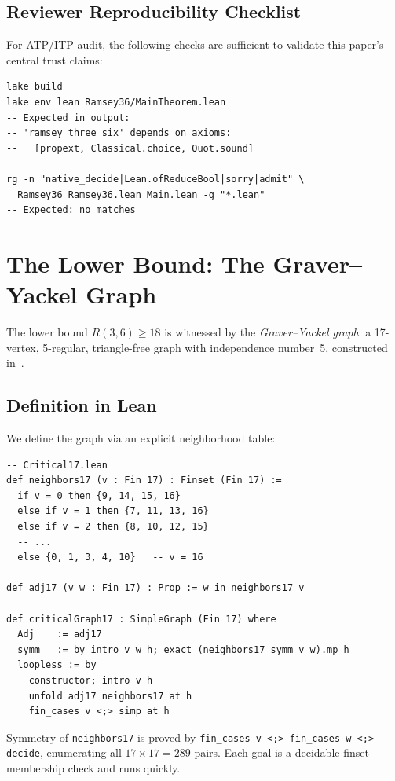 \documentclass[11pt]{article}
\newcommand{\lean}[1]{\texttt{#1}}
\begin{document}
\subsection{Reviewer Reproducibility Checklist}
\label{sec:repro}

For ATP/ITP audit, the following checks are sufficient to validate this paper's
central trust claims:

\begin{lstlisting}
lake build
lake env lean Ramsey36/MainTheorem.lean
-- Expected in output:
-- 'ramsey_three_six' depends on axioms:
--   [propext, Classical.choice, Quot.sound]

rg -n "native_decide|Lean.ofReduceBool|sorry|admit" \
  Ramsey36 Ramsey36.lean Main.lean -g "*.lean"
-- Expected: no matches
\end{lstlisting}

\section{The Lower Bound: The Graver--Yackel Graph}
\label{sec:lower}

The lower bound $R(3,6) \geq 18$ is witnessed by the \emph{Graver--Yackel graph}:
a 17-vertex, 5-regular, triangle-free graph with independence number~5,
constructed in~\cite{graver1968}.

\subsection{Definition in Lean}

We define the graph via an explicit neighborhood table:

\begin{lstlisting}
-- Critical17.lean
def neighbors17 (v : Fin 17) : Finset (Fin 17) :=
  if v = 0 then {9, 14, 15, 16}
  else if v = 1 then {7, 11, 13, 16}
  else if v = 2 then {8, 10, 12, 15}
  -- ...
  else {0, 1, 3, 4, 10}   -- v = 16

def adj17 (v w : Fin 17) : Prop := w in neighbors17 v

def criticalGraph17 : SimpleGraph (Fin 17) where
  Adj    := adj17
  symm   := by intro v w h; exact (neighbors17_symm v w).mp h
  loopless := by
    constructor; intro v h
    unfold adj17 neighbors17 at h
    fin_cases v <;> simp at h
\end{lstlisting}

\noindent
Symmetry of \lean{neighbors17} is proved by
\lean{fin\_cases v <;> fin\_cases w <;> decide},
enumerating all $17 \times 17 = 289$ pairs.
Each goal is a decidable finset-membership check and runs quickly.
\end{document}
